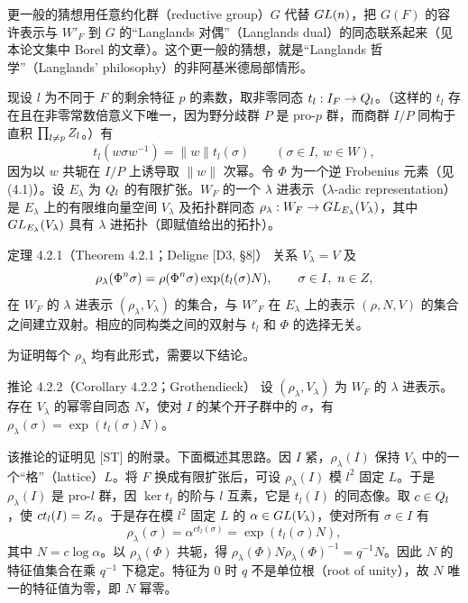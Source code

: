 更一般的猜想用任意约化群（reductive group）$G$ 代替 $GL(n)$，把 $G(F)$ 的容许表示与 $W'_F$ 到 $G$ 的“Langlands 对偶”（Langlands dual）的同态联系起来（见本论文集中 Borel 的文章）。这个更一般的猜想，就是“Langlands 哲学”（Langlands' philosophy）的非阿基米德局部情形。

现设 $l$ 为不同于 $F$ 的剩余特征 $p$ 的素数，取非零同态 $t_l:I_F\to Q_l$。（这样的 $t_l$ 存在且在非零常数倍意义下唯一，因为野分歧群 $P$ 是 pro-$p$ 群，而商群 $I/P$ 同构于直积 $\prod_{l\neq p}Z_l$。）有
\[
 t_l(w\sigma w^{-1})=\lVert w\rVert t_l(\sigma)\qquad(\sigma\in I,\ w\in W),
\]
因为以 $w$ 共轭在 $I/P$ 上诱导取 $\lVert w\rVert$ 次幂。令 $\Phi$ 为一个逆 Frobenius 元素（见 (4.1)）。设 $E_\lambda$ 为 $Q_l$ 的有限扩张。$W_F$ 的一个 $\lambda$ 进表示（$\lambda$-adic representation）是 $E_\lambda$ 上的有限维向量空间 $V_\lambda$ 及拓扑群同态 $\rho_\lambda:W_F\to GL_{E_\lambda}(V_\lambda)$，其中 $GL_{E_\lambda}(V_\lambda)$ 具有 $\lambda$ 进拓扑（即赋值给出的拓扑）。

\begin{originaltheorem}{定理 4.2.1（Theorem 4.2.1；Deligne [D3, §8]）}
关系 $V_\lambda=V$ 及
\[
 \rho_\lambda(\Phi^n\sigma)=\rho(\Phi^n\sigma)\exp(t_l(\sigma)N),
 \qquad\sigma\in I,\ n\in Z,
\]
在 $W_F$ 的 $\lambda$ 进表示 $(\rho_\lambda,V_\lambda)$ 的集合，与 $W'_F$ 在 $E_\lambda$ 上的表示 $(\rho,N,V)$ 的集合之间建立双射。相应的同构类之间的双射与 $t_l$ 和 $\Phi$ 的选择无关。
\end{originaltheorem}
为证明每个 $\rho_\lambda$ 均有此形式，需要以下结论。
\begin{originaltheorem}{推论 4.2.2（Corollary 4.2.2；Grothendieck）}
设 $(\rho_\lambda,V_\lambda)$ 为 $W_F$ 的 $\lambda$ 进表示。存在 $V_\lambda$ 的幂零自同态 $N$，使对 $I$ 的某个开子群中的 $\sigma$，有 $\rho_\lambda(\sigma)=\exp(t_l(\sigma)N)$。
\end{originaltheorem}
该推论的证明见 [ST] 的附录。下面概述其思路。因 $I$ 紧，$\rho_\lambda(I)$ 保持 $V_\lambda$ 中的一个“格”（lattice）$L$。将 $F$ 换成有限扩张后，可设 $\rho_\lambda(I)$ 模 $l^2$ 固定 $L$。于是 $\rho_\lambda(I)$ 是 pro-$l$ 群，因 $\ker t_l$ 的阶与 $l$ 互素，它是 $t_l(I)$ 的同态像。取 $c\in Q_l$，使 $ct_l(I)=Z_l$。于是存在模 $l^2$ 固定 $L$ 的 $\alpha\in GL(V_\lambda)$，使对所有 $\sigma\in I$ 有
\[
 \rho_\lambda(\sigma)=\alpha^{ct_l(\sigma)}=\exp(t_l(\sigma)N),
\]
其中 $N=c\log\alpha$。以 $\rho_\lambda(\Phi)$ 共轭，得 $\rho_\lambda(\Phi)N\rho_\lambda(\Phi)^{-1}=q^{-1}N$。因此 $N$ 的特征值集合在乘 $q^{-1}$ 下稳定。特征为 $0$ 时 $q$ 不是单位根（root of unity），故 $N$ 唯一的特征值为零，即 $N$ 幂零。


